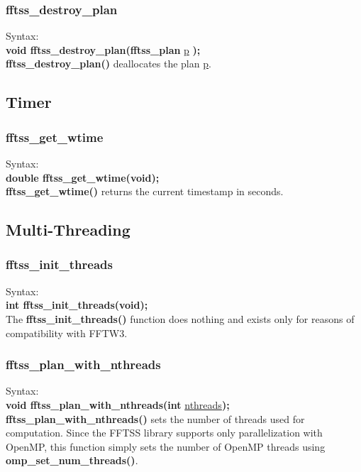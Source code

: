 \documentclass{article}
\begin{document}
\subsubsection{fftss\_destroy\_plan}
Syntax:\\
{\bf void fftss\_destroy\_plan(fftss\_plan }\underline{p}
{\bf );}\\

{\bf fftss\_destroy\_plan()} deallocates the plan \underline{p}.

\subsection{Timer}

\subsubsection{fftss\_get\_wtime}
Syntax:\\
{\bf double fftss\_get\_wtime(void);}\\

{\bf fftss\_get\_wtime()} returns the current timestamp in seconds.

\subsection{Multi-Threading}

\subsubsection{fftss\_init\_threads}
Syntax:\\
{\bf int fftss\_init\_threads(void);}\\

The {\bf fftss\_init\_threads()} function does nothing and exists only 
for reasons of compatibility with FFTW3.

\subsubsection{fftss\_plan\_with\_nthreads}
Syntax:\\
{\bf void fftss\_plan\_with\_nthreads(int }\underline{nthreads}{\bf );}\\

{\bf fftss\_plan\_with\_nthreads()} sets the number of threads 
 used for computation. Since the FFTSS library supports only
 parallelization with OpenMP, this function simply 
sets the number of OpenMP threads using {\bf omp\_set\_num\_threads()}.
\end{document}
